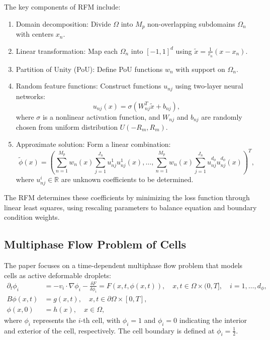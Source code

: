 \documentclass[11pt]{article}
\begin{document}
The key components of RFM include:
\begin{enumerate}
    \item Domain decomposition: Divide $\Omega$ into $M_p$ non-overlapping subdomains $\Omega_n$ with centers $x_n$.
    \item Linear transformation: Map each $\Omega_n$ into $[-1,1]^d$ using $\tilde{x} = \frac{1}{r_n}(x-x_n)$.
    \item Partition of Unity (PoU): Define PoU functions $w_n$ with support on $\Omega_n$.
    \item Random feature functions: Construct functions $u_{nj}$ using two-layer neural networks:
    \begin{equation}
        u_{nj}(x) = \sigma(W_{nj}^T\tilde{x}+b_{nj}),
    \end{equation}
    where $\sigma$ is a nonlinear activation function, and $W_{nj}$ and $b_{nj}$ are randomly chosen from uniform distribution $U(-R_m, R_m)$.
    \item Approximate solution: Form a linear combination:
    \begin{equation}
        \tilde{\phi}(x) = \left(\sum_{n=1}^{M_p}w_n(x)\sum_{j=1}^{J_n}u^1_{nj}u^1_{nj}(x), \ldots, \sum_{n=1}^{M_p}w_n(x)\sum_{j=1}^{J_n}u^{d_\phi}_{nj}u^{d_\phi}_{nj}(x)\right)^T,
    \end{equation}
    where $u^i_{nj} \in \mathbb{R}$ are unknown coefficients to be determined.
\end{enumerate}

The RFM determines these coefficients by minimizing the loss function through linear least squares, using rescaling parameters to balance equation and boundary condition weights.

\subsection{Multiphase Flow Problem of Cells}

The paper focuses on a time-dependent multiphase flow problem that models cells as active deformable droplets:
\begin{align}
    \partial_t \phi_i &= -v_i \cdot \nabla\phi_i - \frac{\delta F}{\delta \phi_i} = F(x,t,\phi(x,t)), \quad x,t \in \Omega \times (0,T], \quad i=1,\ldots,d_\phi, \\
    B\phi(x,t) &= g(x,t), \quad x,t \in \partial\Omega \times [0,T], \\
    \phi(x,0) &= h(x), \quad x \in \Omega,
\end{align}
where $\phi_i$ represents the $i$-th cell, with $\phi_i = 1$ and $\phi_i = 0$ indicating the interior and exterior of the cell, respectively. The cell boundary is defined at $\phi_i = \frac{1}{2}$.
\end{document}

